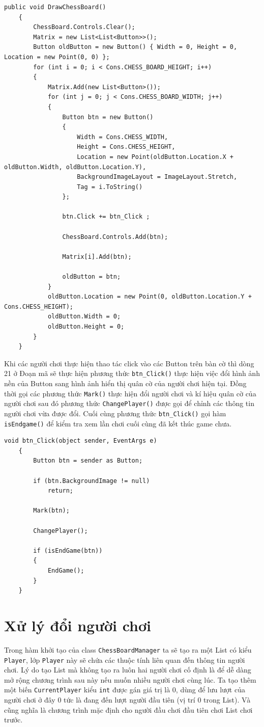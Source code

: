\begin{lstlisting}[language={[Sharp]C}, caption = Phương thức \texttt{DrawChessBoard()}]
	public void DrawChessBoard()
	{
		ChessBoard.Controls.Clear();
		Matrix = new List<List<Button>>();
		Button oldButton = new Button() { Width = 0, Height = 0, Location = new Point(0, 0) };
		for (int i = 0; i < Cons.CHESS_BOARD_HEIGHT; i++)
		{
			Matrix.Add(new List<Button>());
			for (int j = 0; j < Cons.CHESS_BOARD_WIDTH; j++)
			{
				Button btn = new Button()
				{
					Width = Cons.CHESS_WIDTH,
					Height = Cons.CHESS_HEIGHT,
					Location = new Point(oldButton.Location.X + oldButton.Width, oldButton.Location.Y),
					BackgroundImageLayout = ImageLayout.Stretch,
					Tag = i.ToString()
				};

				btn.Click += btn_Click ;

				ChessBoard.Controls.Add(btn);

				Matrix[i].Add(btn);

				oldButton = btn;
			}
			oldButton.Location = new Point(0, oldButton.Location.Y + Cons.CHESS_HEIGHT);
			oldButton.Width = 0;
			oldButton.Height = 0;
		}
	}
\end{lstlisting}
Khi các người chơi thực hiện thao tác click vào các Button trên bàn cờ thì dòng 21 ở Đoạn mã sẽ thực hiện phương thức \texttt{btn\_Click()} thực hiện việc đổi hình ảnh nền của Button sang hình ảnh hiển thị quân cờ của người chơi hiện tại. Đồng thời gọi các phương thức \texttt{Mark()} thực hiện đổi người chơi và kí hiệu quân cờ của người chơi sau đó phương thức \texttt{ChangePlayer()} được gọi để chỉnh các thông tin người chơi vừa được đổi. Cuối cùng phương thức \texttt{btn\_Click()} gọi hàm \texttt{isEndgame()} để kiểm tra xem lần chơi cuối cùng đã kết thúc game chưa.
\begin{lstlisting}[language={[Sharp]C},label={code:btn_Click}, caption = Phương thức \texttt{btn\_Click()}]
	void btn_Click(object sender, EventArgs e)
	{
		Button btn = sender as Button;

		if (btn.BackgroundImage != null)
			return;
		
		Mark(btn);
		
		ChangePlayer();

		if (isEndGame(btn))
		{
			EndGame();
		}   
	}
\end{lstlisting}
\section{Xử lý đổi người chơi}
Trong hàm khởi tạo của class \texttt{ChessBoardManager} ta sẽ tạo ra một List có kiểu \texttt{Player}, lớp \texttt{Player} này sẽ chứa các thuộc tính liên quan đến thông tin người chơi. Lý do tạo List mà không tạo ra luôn hai người chơi cố định là để dễ dàng mở rộng chương trình sau này nếu muốn nhiều người chơi cùng lúc. Ta tạo thêm một biến \texttt{CurrentPlayer} kiểu \texttt{int} được gán giá trị là 0, dùng để lưu lượt của người chơi ở đây 0 tức là đang đến lượt người đầu tiên (vị trí 0 trong List). Và cũng nghĩa là chương trình mặc định cho người đầu chơi đầu tiên chơi List chơi trước.

